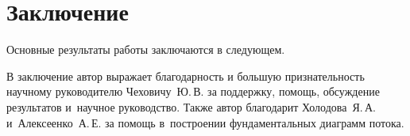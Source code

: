 \chapter*{Заключение}                       %


Основные результаты работы заключаются в следующем.


В заключение автор выражает благодарность и большую признательность научному руководителю Чеховичу~Ю.\,В. за поддержку, помощь, обсуждение результатов и~научное руководство. 
Также автор благодарит Холодова~Я.\,А. и~Алексеенко~А.\,Е. за помощь в~построении фундаментальных диаграмм потока. 
